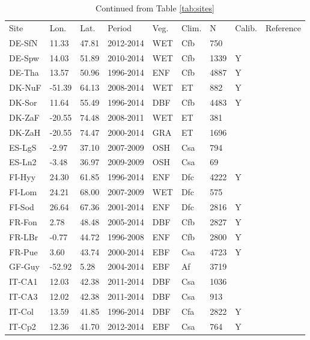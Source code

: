 \documentclass[gmd, manuscript]{copernicus}
\begin{document}
\begin{table}[t]
\caption{Continued from Table \ref{tab:sites}} 
\begin{tabular}{lllllllll}
  \tophline
  Site & Lon. & Lat. & Period & Veg. & Clim. & N & Calib. & Reference \\ 
  \middlehline  
  DE-SfN & 11.33 & 47.81 & 2012-2014 & WET & Cfb & 750 &  & \citet{DE-SfN} \\ 
  DE-Spw & 14.03 & 51.89 & 2010-2014 & WET & Cfb & 1339 & Y & \citet{DE-Spw} \\ 
  DE-Tha & 13.57 & 50.96 & 1996-2014 & ENF & Cfb & 4887 & Y & \citet{DE-Tha} \\ 
  DK-NuF & -51.39 & 64.13 & 2008-2014 & WET & ET & 882 & Y & \citet{DK-NuF} \\ 
  DK-Sor & 11.64 & 55.49 & 1996-2014 & DBF & Cfb & 4483 & Y & \citet{DK-Sor} \\ 
  DK-ZaF & -20.55 & 74.48 & 2008-2011 & WET & ET & 381 &  & \citet{DK-ZaF} \\ 
  DK-ZaH & -20.55 & 74.47 & 2000-2014 & GRA & ET & 1696 &  & \citet{DK-ZaH} \\ 
  ES-LgS & -2.97 & 37.10 & 2007-2009 & OSH & Csa & 794 &  & \citet{ES-LgS} \\ 
  ES-Ln2 & -3.48 & 36.97 & 2009-2009 & OSH & Csa &  69 &  & \citet{ES-Ln2} \\ 
  FI-Hyy & 24.30 & 61.85 & 1996-2014 & ENF & Dfc & 4222 & Y & \citet{FI-Hyy} \\ 
  FI-Lom & 24.21 & 68.00 & 2007-2009 & WET & Dfc & 575 &  & \citet{FI-Lom} \\ 
  FI-Sod & 26.64 & 67.36 & 2001-2014 & ENF & Dfc & 2816 & Y & \citet{FI-Sod} \\ 
  FR-Fon & 2.78 & 48.48 & 2005-2014 & DBF & Cfb & 2827 & Y & \citet{FR-Fon} \\ 
  FR-LBr & -0.77 & 44.72 & 1996-2008 & ENF & Cfb & 2800 & Y & \citet{FR-LBr} \\ 
  FR-Pue & 3.60 & 43.74 & 2000-2014 & EBF & Csa & 4723 & Y & \citet{FR-Pue} \\ 
  GF-Guy & -52.92 & 5.28 & 2004-2014 & EBF & Af & 3719 &  & \citet{GF-Guy} \\ 
  IT-CA1 & 12.03 & 42.38 & 2011-2014 & DBF & Csa & 1036 &  & \citet{IT-CA1} \\ 
  IT-CA3 & 12.02 & 42.38 & 2011-2014 & DBF & Csa & 913 &  & \citet{IT-CA3} \\ 
  IT-Col & 13.59 & 41.85 & 1996-2014 & DBF & Cfa & 2822 & Y & \citet{IT-Col} \\ 
  IT-Cp2 & 12.36 & 41.70 & 2012-2014 & EBF & Csa & 764 & Y & \citet{IT-Cp2} \\ 

\end{tabular}
\end{table}
\end{document}
